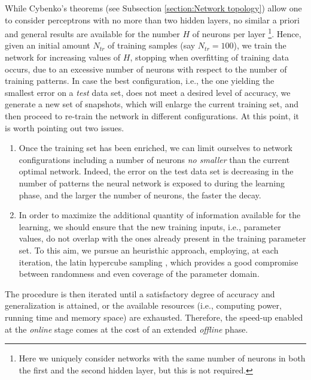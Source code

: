 \documentclass[longtitle]{elsarticle}
\numberwithin{equation}{section}
\theoremstyle{theorem}
\theoremstyle{definition}
\theoremstyle{remark}
\theoremstyle{proposition}
\numberwithin{figure}{section}
\begin{document}
		While Cybenko's theorems (see Subsection \ref{section:Network topology}) allow one to consider perceptrons with no more than two hidden layers, no similar a priori and general results are available for the number $H$ of neurons per layer \footnote{ Here we uniquely consider networks with the same number of neurons in both the first and the second hidden layer, but this is not required.}. Hence, given an initial amount $N_{tr}$ of training samples (say $N_{tr} = 100$), we train the network for increasing values of $H$, stopping when overfitting of training data occurs, due to an excessive number of neurons with respect to the number of training patterns. In case the best configuration, i.e., the one yielding the smallest error on a \emph{test} data set, does not meet a desired level of accuracy, we generate a new set of snapshots, which will enlarge the current training set, and then proceed to re-train the network in different configurations. At this point, it is worth pointing out two issues. 
		\begin{enumerate}[label=(\roman*)]
			\vspace*{-0.1cm}
			\item Once the training set has been enriched, we can limit ourselves to network configurations including a number of neurons \emph{no smaller} than the current optimal network. Indeed, the error on the test data set is decreasing in the number of patterns the neural network is exposed to during the learning phase, and the larger the number of neurons, the faster the decay.
			\item In order to maximize the additional quantity of information available for the learning, we should ensure that the new training inputs, i.e., parameter values, do not overlap with the ones already present in the training parameter set. To this aim, we pursue an heuristhic approach, employing, at each iteration, the latin hypercube sampling \cite{Imam08}, which provides a good compromise between randomness and even coverage of the parameter domain. 	
		\end{enumerate} 
		\vspace*{-0.1cm}
		The procedure is then iterated until a satisfactory degree of accuracy and generalization is attained, or the available resources (i.e., computing power, running time and memory space) are exhausted. Therefore, the speed-up enabled at the \emph{online} stage comes at the cost of an extended \emph{offline} phase. 
		
\end{document}
